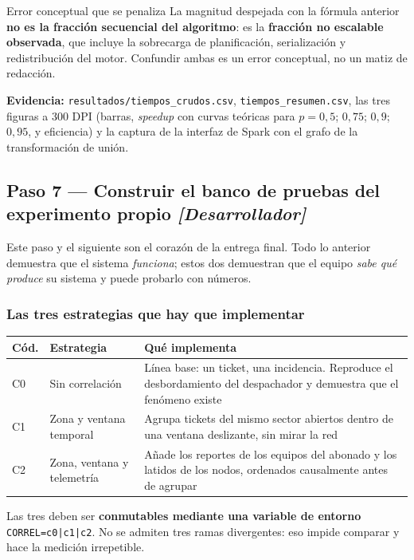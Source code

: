 \documentclass[11pt,a4paper]{article}
\newcommand{\paso}[1]{\subsection{#1}}
\begin{document}
	\begin{avisoBox}{Error conceptual que se penaliza}
		La magnitud despejada con la fórmula anterior \textbf{no es la fracción secuencial del algoritmo}: es la \textbf{fracción no escalable observada}, que incluye la sobrecarga de planificación, serialización y redistribución del motor. Confundir ambas es un error conceptual, no un matiz de redacción.
	\end{avisoBox}
	
	\textbf{Evidencia:} \texttt{resultados/tiempos\_crudos.csv}, \texttt{tiempos\_resumen.csv}, las tres figuras a 300 DPI (barras, \emph{speedup} con curvas teóricas para $p=0{,}5$; $0{,}75$; $0{,}9$; $0{,}95$, y eficiencia) y la captura de la interfaz de Spark con el grafo de la transformación de unión.
	
	\paso{Paso 7 --- Construir el banco de pruebas del experimento propio \emph{[Desarrollador]}}
	
	Este paso y el siguiente son el corazón de la entrega final. Todo lo anterior demuestra que el sistema \emph{funciona}; estos dos demuestran que el equipo \emph{sabe qué produce} su sistema y puede probarlo con números.
	
	\subsubsection{Las tres estrategias que hay que implementar}
	
	\begin{center}
		\small
		\begin{tabular}{@{}p{1.0cm}p{4.4cm}p{9.5cm}@{}}
			\toprule
			\textbf{Cód.} & \textbf{Estrategia} & \textbf{Qué implementa} \\
			\midrule
			C0 & Sin correlación & Línea base: un ticket, una incidencia. Reproduce el desbordamiento del despachador y demuestra que el fenómeno existe \\
			C1 & Zona y ventana temporal & Agrupa tickets del mismo sector abiertos dentro de una ventana deslizante, sin mirar la red \\
			C2 & Zona, ventana y telemetría & Añade los reportes de los equipos del abonado y los latidos de los nodos, ordenados causalmente antes de agrupar \\
			\bottomrule
		\end{tabular}
	\end{center}
	
	Las tres deben ser \textbf{conmutables mediante una variable de entorno} \texttt{CORREL=c0|c1|c2}. No se admiten tres ramas divergentes: eso impide comparar y hace la medición irrepetible.
	
\end{document}

